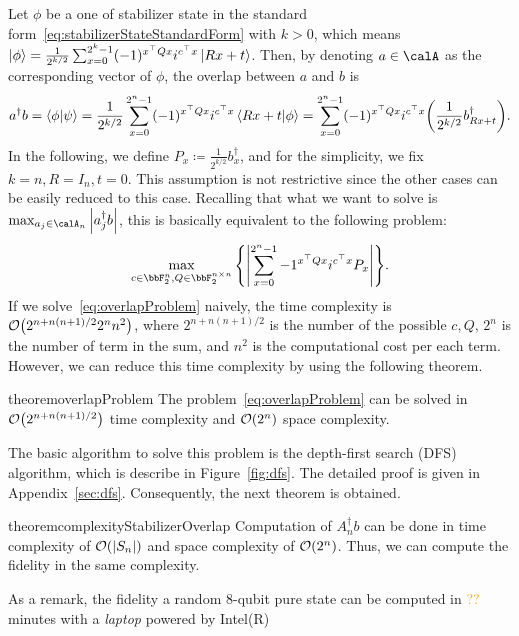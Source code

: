 \documentclass[a4paper, onecolumn, 11pt, longbibliography]{quantumarticle}
\newcommand{\orange}[1]{\textcolor{orange}{#1}}
\newcommand{\defeq}{\coloneqq}
\begin{document}
Let $\phi$ be a one of stabilizer state
in the standard form~\eqref{eq:stabilizerStateStandardForm}
with $k>0$, which means
$\ket{\phi} = \frac{1}{2^{k/2}}\sum_{x=0}^{2^k-1} (-1)^{x^\top Q x} i^{c^\top x} \ket{Rx+t}$.
Then, by denoting $a \in \calA$ as the corresponding vector of $\phi$,
the overlap between $a$ and $b$ is
\begin{equation*}
  a^\dagger b
  = \braket{\phi}{\psi}
  = \frac{1}{2^{k/2}} \sum_{x=0}^{2^n-1} (-1)^{x^\top Q x} i^{c^\top x} \braket{Rx+t}{\phi}
  = \sum_{x=0}^{2^n-1} (-1)^{x^\top Q x} i^{c^\top x} \qty(\frac{1}{2^{k/2}}b_{Rx+t}^\dagger).
\end{equation*}
In the following, we define $P_x \defeq \frac{1}{2^{k/2}}b_x^\dagger$,
and for the simplicity, we fix $k=n,R=I_n,t=0$.
This assumption is not restrictive since
the other cases can be easily reduced to this case.
Recalling that what we want to solve
is $\max_{a_j \in \calA_n} \abs{a_j^\dagger b}$,
this is basically equivalent to the following problem:
\begin{equation}\label{eq:overlapProblem}
  \max_{c\in \bbF_2^{n},Q\in \bbF_2^{n \times n}} \qty{ \abs{\sum_{x=0}^{2^n-1} -1^{x^\top Q x} i^{c^\top x} P_x} }.
\end{equation}
If we solve~\eqref{eq:overlapProblem} naively,
the time complexity is $\order{2^{n+n(n+1)/2} 2^n n^2}$,
where $2^{n+n(n+1)/2}$ is the number of the possible $c,Q$,
$2^n$ is the number of term in the sum,
and $n^2$ is the computational cost per each term.
However, we can reduce this time complexity
by using the following theorem.
\begin{restatable}{theorem}{overlapProblem}
  \label{thm:overlapProblem}
  The problem~\eqref{eq:overlapProblem} can be solved
  in $\order{2^{n+n(n+1)/2}}$ time complexity and $\order{2^n}$ space complexity.
\end{restatable}
The basic algorithm to solve this problem
is the depth-first search (DFS) algorithm,
which is describe in Figure~\ref{fig:dfs}.
The detailed proof is given in Appendix~\ref{sec:dfs}.
Consequently, the next theorem is obtained.
\begin{restatable}{theorem}{complexityStabilizerOverlap}
  \label{thm:complexityStabilizerOverlap}
  Computation of $A_n^\dagger b$
  can be done in time complexity of
  $\order{\abs{S_n}}$ and
  space complexity of $\order{2^n}$.
  Thus, we can compute the fidelity
  in the same complexity.
\end{restatable}
As a remark,
the fidelity a random 8-qubit pure state can be computed
in \orange{??} minutes with a \textit{laptop} powered by Intel(R)
\end{document}

